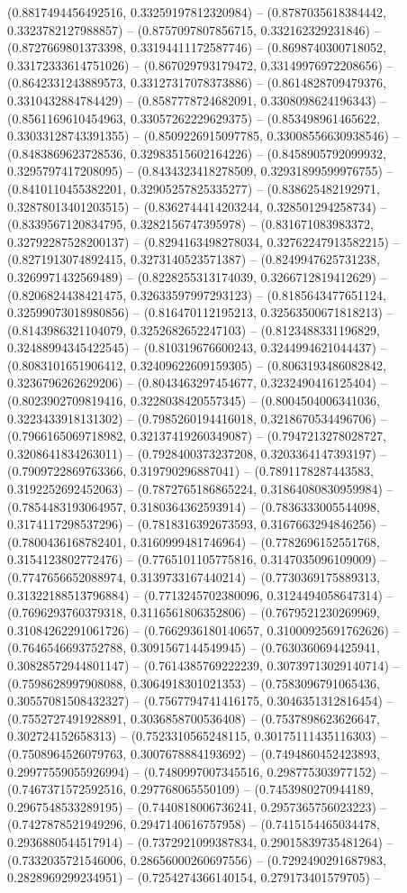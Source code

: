 (0.8817494456492516, 0.33259197812320984) -- (0.8787035618384442, 0.3323782127988857) -- (0.8757097807856715, 0.332162329231846) -- (0.8727669801373398, 0.33194411172587746) -- (0.8698740300718052, 0.33172333614751026) -- (0.867029793179472, 0.33149976972208656) -- (0.8642331243889573, 0.33127317078373886) -- (0.8614828709479376, 0.3310432884784429) -- (0.8587778724682091, 0.3308098624196343) -- (0.8561169610454963, 0.33057262229629375) -- (0.853498961465622, 0.33033128743391355) -- (0.8509226915097785, 0.33008556630938546) -- (0.8483869623728536, 0.32983515602164226) -- (0.8458905792099932, 0.3295797417208095) -- (0.8434323418278509, 0.32931899599976755) -- (0.8410110455382201, 0.32905257825335277) -- (0.838625482192971, 0.32878013401203515) -- (0.8362744414203244, 0.328501294258734) -- (0.8339567120834795, 0.3282156747395978) -- (0.831671083983372, 0.32792287528200137) -- (0.8294163498278034, 0.32762247913582215) -- (0.8271913074892415, 0.3273140523571387) -- (0.8249947625731238, 0.3269971432569489) -- (0.8228255313174039, 0.3266712819412629) -- (0.8206824438421475, 0.32633597997293123) -- (0.8185643477651124, 0.32599073018980856) -- (0.816470112195213, 0.32563500671818213) -- (0.8143986321104079, 0.3252682652247103) -- (0.8123488331196829, 0.32488994345422545) -- (0.810319676600243, 0.3244994621044437) -- (0.8083101651906412, 0.32409622609159305) -- (0.8063193486082842, 0.3236796262629206) -- (0.8043463297454677, 0.3232490416125404) -- (0.8023902709819416, 0.3228038420557345) -- (0.8004504006341036, 0.3223433918131302) -- (0.7985260194416018, 0.3218670534496706) -- (0.7966165069718982, 0.32137419260349087) -- (0.7947213278028727, 0.3208641834263011) -- (0.7928400373237208, 0.3203364147393197) -- (0.7909722869763366, 0.319790296887041) -- (0.7891178287443583, 0.3192252692452063) -- (0.7872765186865224, 0.31864080830959984) -- (0.7854483193064957, 0.3180364362593914) -- (0.7836333005544098, 0.3174117298537296) -- (0.7818316392673593, 0.3167663294846256) -- (0.7800436168782401, 0.3160999481746964) -- (0.7782696152551768, 0.3154123802772476) -- (0.7765101105775816, 0.3147035096109009) -- (0.7747656652088974, 0.3139733167440214) -- (0.7730369175889313, 0.31322188513796884) -- (0.7713245702380096, 0.3124494058647314) -- (0.7696293760379318, 0.3116561806352806) -- (0.7679521230269969, 0.31084262291061726) -- (0.7662936180140657, 0.31000925691762626) -- (0.7646546693752788, 0.3091567144549945) -- (0.7630360694425941, 0.30828572944801147) -- (0.7614385769222239, 0.30739713029140714) -- (0.7598628997908088, 0.3064918301021353) -- (0.7583096791065436, 0.30557081508432327) -- (0.7567794741416175, 0.3046351312816454) -- (0.7552727491928891, 0.3036858700536408) -- (0.7537898623626647, 0.302724152658313) -- (0.7523310565248115, 0.30175111435116303) -- (0.7508964526079763, 0.3007678884193692) -- (0.7494860452423893, 0.29977559055926994) -- (0.7480997007345516, 0.298775303977152) -- (0.7467371572592516, 0.297768065550109) -- (0.7453980270944189, 0.2967548533289195) -- (0.7440818006736241, 0.2957365756023223) -- (0.7427878521949296, 0.2947140616757958) -- (0.7415154465034478, 0.2936880544517914) -- (0.7372921099387834, 0.29015839735481264) -- (0.7332035721546006, 0.28656000260697556) -- (0.7292490291687983, 0.2828969299234951) -- (0.7254274366140154, 0.279173401579705) -- 